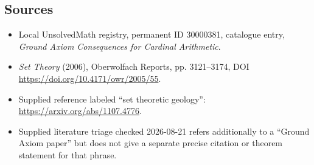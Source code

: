 \documentclass[11pt]{article}
\begin{document}
\subsection{Sources}
\begin{itemize}
\item Local UnsolvedMath registry, permanent ID 30000381, catalogue entry, \emph{Ground Axiom Consequences for Cardinal Arithmetic}.
\item \emph{Set Theory} (2006), Oberwolfach Reports, pp. 3121--3174, DOI \url{https://doi.org/10.4171/owr/2005/55}.
\item Supplied reference labeled ``set theoretic geology'': \url{https://arxiv.org/abs/1107.4776}.
\item Supplied literature triage checked 2026-08-21 refers additionally to a ``Ground Axiom paper'' but does not give a separate precise citation or theorem statement for that phrase.
\end{itemize}
\end{document}
